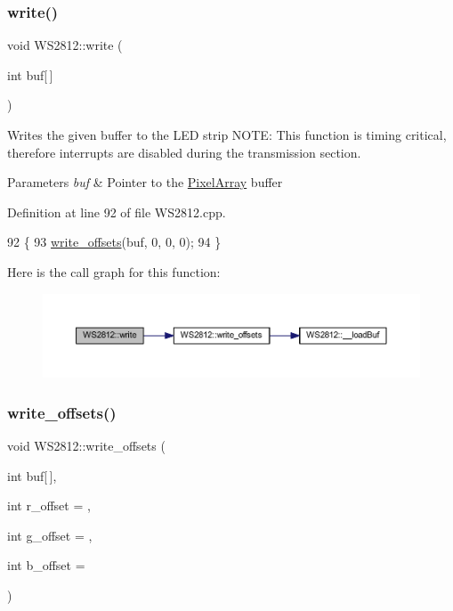 \subsubsection{\texorpdfstring{write()}{write()}}
{\footnotesize\ttfamily void W\+S2812\+::write (\begin{DoxyParamCaption}\item[{int}]{buf\mbox{[}$\,$\mbox{]} }\end{DoxyParamCaption})}



Writes the given buffer to the L\+ED strip N\+O\+TE\+: This function is timing critical, therefore interrupts are disabled during the transmission section. 


\begin{DoxyParams}{Parameters}
{\em buf} & Pointer to the \hyperlink{class_pixel_array}{Pixel\+Array} buffer \\
\hline
\end{DoxyParams}


Definition at line 92 of file W\+S2812.\+cpp.


\begin{DoxyCode}
92                             \{
93     \hyperlink{class_w_s2812_a578fd0b278445bd6f84e260a69b18a68}{write\_offsets}(buf, 0, 0, 0);
94 \}
\end{DoxyCode}
Here is the call graph for this function\+:\nopagebreak
\begin{figure}[H]
\begin{center}
\leavevmode
\includegraphics[width=350pt]{class_w_s2812_ab85d6a78bc51929dac48db05f6bc68d4_cgraph}
\end{center}
\end{figure}
\mbox{\label{class_w_s2812_a578fd0b278445bd6f84e260a69b18a68}} 
\subsubsection{\texorpdfstring{write\+\_\+offsets()}{write\_offsets()}}
{\footnotesize\ttfamily void W\+S2812\+::write\+\_\+offsets (\begin{DoxyParamCaption}\item[{int}]{buf\mbox{[}$\,$\mbox{]},  }\item[{int}]{r\+\_\+offset = {},  }\item[{int}]{g\+\_\+offset = {},  }\item[{int}]{b\+\_\+offset = {} }\end{DoxyParamCaption})}



